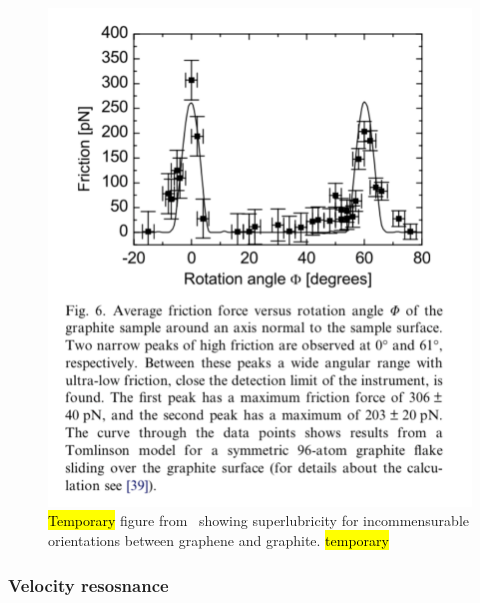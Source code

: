 \begin{figure}[H]
  \centering
  \includegraphics[width=0.5\linewidth]{figures/theory/graphene_rot.png}
  \caption{\hl{Temporary} figure from~\cite{DIENWIEBEL2005197} showing superlubricity for incommensurable orientations between graphene and graphite. \hl{temporary}}
  \label{fig:graphene_rot}
\end{figure}










\subsubsection{Velocity resosnance} %



